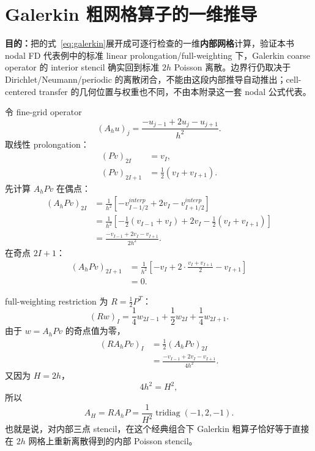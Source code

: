 \chapter{Galerkin 粗网格算子的一维推导}
\label{app:galerkin}

\begin{keybox}
\textbf{目的：}把的式~\eqref{eq:galerkin}展开成可逐行检查的一维\textbf{内部网格}计算，验证本书 nodal FD 代表例中的标准 linear prolongation/full-weighting 下，Galerkin coarse operator 的 interior stencil 确实回到标准 $2h$ Poisson 离散。边界行仍取决于 Dirichlet/Neumann/periodic 的离散闭合，不能由这段内部推导自动推出；cell-centered transfer 的几何位置与权重也不同，不由本附录这一套 nodal 公式代表。
\end{keybox}


令 fine-grid operator
\begin{equation}
(A_hu)_j=\frac{-u_{j-1}+2u_j-u_{j+1}}{h^2}.
\end{equation}
取线性 prolongation：
\begin{align}
(Pv)_{2I}&=v_I,\\
(Pv)_{2I+1}&=\frac12(v_I+v_{I+1}).
\end{align}
先计算 $A_hPv$ 在偶点：
\begin{align}
(A_hPv)_{2I}
&=\frac{1}{h^2}
\left[
-v_{I-1/2}^{interp}+2v_I-v_{I+1/2}^{interp}
\right]\\
&=\frac{1}{h^2}
\left[-\frac12(v_{I-1}+v_I)+2v_I-\frac12(v_I+v_{I+1})\right]\\
&=\frac{-v_{I-1}+2v_I-v_{I+1}}{2h^2}.
\end{align}
在奇点 $2I+1$：
\begin{align}
(A_hPv)_{2I+1}
&=\frac{1}{h^2}
\left[-v_I+2\cdot\frac{v_I+v_{I+1}}2-v_{I+1}\right]\\
&=0.
\end{align}

full-weighting restriction 为 $R=\frac12P^T$：
\begin{equation}
(Rw)_I=\frac14w_{2I-1}+\frac12w_{2I}+\frac14w_{2I+1}.
\end{equation}
由于 $w=A_hPv$ 的奇点值为零，
\begin{align}
(RA_hPv)_I
&=\frac12(A_hPv)_{2I}\\
&=\frac{-v_{I-1}+2v_I-v_{I+1}}{4h^2}.
\end{align}
又因为 $H=2h$，
\begin{equation}
4h^2=H^2,
\end{equation}
所以
\begin{equation}
\boxed{A_H=RA_hP
=\frac{1}{H^2}\operatorname{tridiag}(-1,2,-1)}.
\end{equation}
也就是说，对内部三点 stencil，在这个经典组合下 Galerkin 粗算子恰好等于直接在 $2h$ 网格上重新离散得到的内部 Poisson stencil。

